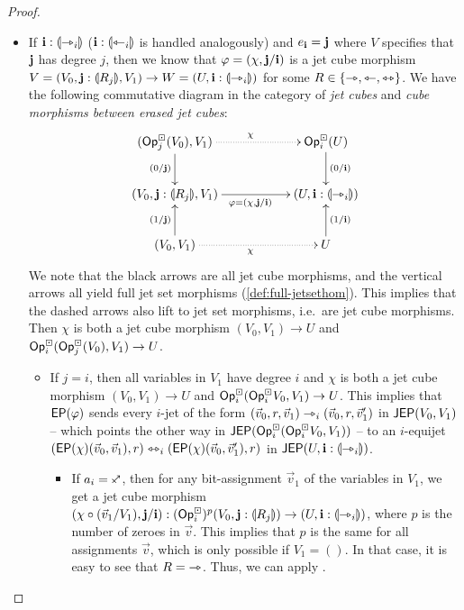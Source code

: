 \documentclass[a4paper]{memoir}
\begin{document}
\begin{proof}
\begin{itemize}
		\item If $\mathbf{i} : {\llparenthesis \rightarrowtriangle_i \rrparenthesis}$ ($\mathbf{i} : {\llparenthesis \leftarrowtriangle_i \rrparenthesis}$ is handled analogously) and $e_{\mathbf{i}} = \mathbf{j}$ where $V$ specifies that $\mathbf{j}$ has degree $j$, then we know that $\varphi = (\chi, \mathbf{j} / \mathbf{i})$ is a jet cube morphism $V = (V_0, \mathbf{j} : {\llparenthesis R_j \rrparenthesis}, V_1) \to W = (U, \mathbf{i} : {\llparenthesis \rightarrowtriangle_i \rrparenthesis})$ for some $R \in \mathopen{}\left\{ \rightarrowtriangle, \leftarrowtriangle, \leftrightarrowtriangle \right\}\mathclose{}$.
		We have the following commutative diagram in the category of \emph{jet cubes} and \emph{cube morphisms between erased jet cubes}:
		\[
			\xymatrix{
				(\Opcube_j(V_0), V_1)
					\ar[d]_{(0/\dm j)}
					\ar@{.>}[rr]^\chi
				&&
				\Opcube_i(U)
					\ar[d]^{(0/\dm i)}
				\\
				(V_0, \dm j : \rival{R_j}, V_1)
					\ar[rr]_{\vfi = (\chi, \dm j / \dm i)}
				&& (U, \dm i : \rival{\jet_i})
				\\
				(V_0, V_1)
					\ar[u]^{(1/\dm j)}
					\ar@{.>}[rr]_\chi
				&&
				U
					\ar[u]_{(1/\dm i)}
			}
		\]
		We note that the black arrows are all jet cube morphisms, and the vertical arrows all yield full jet set morphisms (\cref{def:full-jetsethom}).
		This implies that the dashed arrows also lift to jet set morphisms, i.e.\ are jet cube morphisms.
		Then $\chi$ is both a jet cube morphism $(V_0, V_1) \to U$ and ${\mathsf{Op}}^\boxdot_i({\mathsf{Op}}^\boxdot_j(V_0), V_1) \to U$.
		\begin{itemize}
			\item If $j = i$, then all variables in $V_1$ have degree $i$ and $\chi$ is both a jet cube morphism $(V_0, V_1) \to U$ and ${\mathsf{Op}}^\boxdot_i({\mathsf{Op}}^\boxdot_i V_0, V_1) \to U$.
			This implies that $\mathsf{EP}(\varphi)$ sends every $i$-jet of the form $(\vec v_0, r, \vec v_1) \rightarrowtriangle_i (\vec v_0, r, \vec v_1')$ in $\mathsf{JEP}(V_0, V_1)$ -- which points the other way in $\mathsf{JEP}({\mathsf{Op}}^\boxdot_i({\mathsf{Op}}^\boxdot_i V_0, V_1))$ -- to an $i$-equijet $(\mathsf{EP}(\chi)(\vec v_0, \vec v_1), r) \leftrightarrowtriangle_i (\mathsf{EP}(\chi)(\vec v_0, \vec v'_1), r)$ in $\mathsf{JEP}(U, \mathbf{i} : {\llparenthesis \rightarrowtriangle_i \rrparenthesis})$.
			\begin{itemize}
				\item If $a_i = \ypolar$, then for any bit-assignment $\vec v_1$ of the variables in $V_1$, we get a jet cube morphism $(\chi \circ (\vec v_1/V_1), \mathbf{j} / \mathbf{i}) : ({\mathsf{Op}}^\boxdot_i)^p(V_0, \mathbf{j} : {\llparenthesis R_j \rrparenthesis}) \to (U, \mathbf{i} : {\llparenthesis \rightarrowtriangle_i \rrparenthesis})$, where $p$ is the number of zeroes in $\vec v$.
				This implies that $p$ is the same for all assignments $\vec v$, which is only possible if $V_1 = ()$.
				In that case, it is easy to see that $R = {\rightarrowtriangle}$.
				Thus, we can apply .
				

\end{itemize}
\end{itemize}
\end{itemize}
\end{proof}
\end{document}
